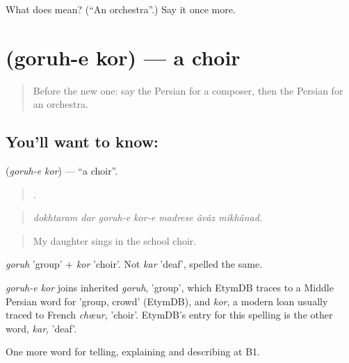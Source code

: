 \begin{tcolorbox}[breakable,colback=teal!4,colframe=teal!35!black,title={Before you move on}]
What does  mean? (\textquotedblleft{}An orchestra\textquotedblright{}.) Say it once more.
\end{tcolorbox}
\section[\texorpdfstring{\fa{گروه} \fa{کر} (goruh-e kor)}{گروه کر (goruh-e kor)}]{  (goruh-e kor) — a choir}

\label{lesson:FA-C520-goruh-e-kor}



\begin{quote}
Before the new one: say the Persian for a composer, then the Persian for an orchestra.
\end{quote}

\subsection*{You'll want to know:  }
\textbf{ } (\emph{goruh-e kor}) — \textquotedblleft{}a choir\textquotedblright{}.

\begin{quote}
      .
\end{quote}

\begin{quote}
\emph{dokhtaram dar goruh-e kor-e madrese âvâz mikhânad.}
\end{quote}

\begin{quote}
My daughter sings in the school choir.
\end{quote}

\emph{goruh} 'group' + \emph{kor} 'choir'. Not \emph{kar} 'deaf', spelled the same.

\begin{cousinweb}
\emph{goruh-e kor} joins inherited \emph{goruh}, 'group', which EtymDB traces to a Middle Persian word for 'group, crowd' (EtymDB), and \emph{kor}, a modern loan usually traced to French \emph{chœur}, 'choir'. EtymDB's entry for this spelling is the other word, \emph{kar}, 'deaf'.
\end{cousinweb}

\begin{grammarlens}[title={What you've built}]
One more word for telling, explaining and describing at B1.
\end{grammarlens}

